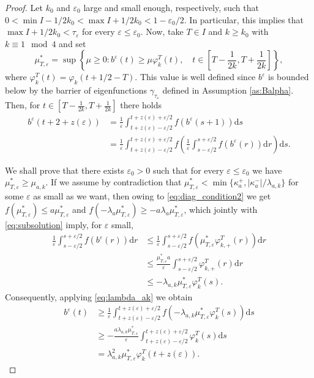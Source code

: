 \documentclass[a4paper,11pt]{article}
\theoremstyle{plain}
\theoremstyle{definition}
\theoremstyle{definition}
\newcommand{\dd}{\mathrm{d}}
\numberwithin{equation}{section}
\begin{document}
\begin{proof}
Let $k_0$ and $\varepsilon_0$ large and small enough, respectively, such that $0<\min I -1/2k_0 < \max I + 1/2k_0<1-\varepsilon_0/2$. In particular, this implies that $\max I + 1/2k_0 < \tau_\varepsilon$ for every $\varepsilon\leq \varepsilon_0$. Now, take $T\in I$ and $k\geq k_0$ with $k \equiv 1 \mod{4}$ and set
\[
    \mu_{T,\varepsilon}^* = \sup \left\{ \mu\geq 0 \colon b^\varepsilon(t) \geq \mu\varphi_k^T(t), \quad t\in\left[ T- \frac{1}{2k},T+\frac{1}{2k} \right] \right\},
\]
where $\varphi_k^T(t) = \varphi_k(t+1/2-T)$. This value is well defined since $b^\varepsilon$ is bounded below by the barrier of eigenfunctions $\gamma_{\tau_\varepsilon}$ defined in Assumption \ref{as:Balpha}. Then, for $t\in\left[ T- \frac{1}{2k},T+\frac{1}{2k} \right]$ there holds 
\begin{align*}
    b^{\varepsilon}(t+2+z(\varepsilon)) &= \frac{1}{\varepsilon} \int_{t+z(\varepsilon)-\varepsilon/2}^{t+z(\varepsilon)+\varepsilon/2} f(b^\varepsilon(s+1)) \dd s \\
    &= \frac{1}{\varepsilon} \int_{t+ z(\varepsilon)-\varepsilon/2}^{t+ z(\varepsilon)+\varepsilon/2} f\left( \frac{1}{\varepsilon} \int_{s-\varepsilon/2}^{s+\varepsilon/2} f(b^\varepsilon(r)) \dd r \right) \dd s.
\end{align*}

We shall prove that there exists $\varepsilon_0>0$ such that for every $\varepsilon\leq \varepsilon_0$ we have $\mu_{T,\varepsilon}^* \geq \mu_{a,k}$. If we assume by contradiction that $\mu_{T,\varepsilon}^* < \min \{ \kappa_a^+, |\kappa_a^-|/\lambda_{a,k} \}$ for some $\varepsilon$ as small as we want, then owing to \eqref{eq:diag_condition2} we get $f(\mu_{T,\varepsilon}^*) \leq a \mu_{T,\varepsilon}^*$ and $f(-\lambda_a \mu_{T,\varepsilon}^*) \geq -a \lambda_a \mu_{T,\varepsilon}^*$, which jointly with \eqref{eq:subsolution} imply, for $\varepsilon$ small,
\begin{align*}
    \frac{1}{\varepsilon} \int_{s-\varepsilon/2}^{s+\varepsilon/2} f(b^\varepsilon(r)) \dd r &\leq \frac{1}{\varepsilon} \int_{s-\varepsilon/2}^{s+\varepsilon/2} f(\mu_{T,\varepsilon}^* \varphi_{k,+}^T(r)) \dd r \\
    &\leq \frac{\mu_{T,\varepsilon}^* a}{\varepsilon} \int_{s-\varepsilon/2}^{s+\varepsilon/2} \varphi_{k,+}^T(r) \dd r \\
    &\leq -\lambda_{a,k} \mu_{T,\varepsilon}^* \varphi_k^T(s).
\end{align*}
Consequently, applying \eqref{eq:lambda_ak} we obtain
\begin{align*}
    b^\varepsilon(t) &\geq \frac{1}{\varepsilon} \int_{t+z(\varepsilon)-\varepsilon/2}^{t+z(\varepsilon)+\varepsilon/2} f(-\lambda_{a,k} \mu_{T,\varepsilon}^* \varphi_k^T(s)) \dd s \\
    &\geq -\frac{a\lambda_{a,k} \mu_{T,\varepsilon}^*}{\varepsilon} \int_{t+z(\varepsilon)-\varepsilon/2}^{t+z(\varepsilon)+\varepsilon/2} \varphi_k^T(s) \dd s \\
    &= \lambda_{a,k}^2 \mu_{T,\varepsilon}^* \varphi_k^T(t+z(\varepsilon)).
\end{align*}


\end{proof}
\end{document}
